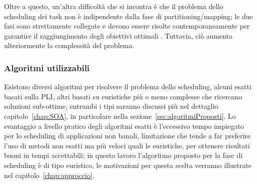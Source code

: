 Oltre a questo, un'altra difficoltà che si incontra è che il problema dello scheduling 
dei task non è indipendente dalla fase di partitioning/mapping; le due fasi sono strettamente 
collegate e devono essere risolte contemporaneamente per garantire il raggiungimento 
degli obiettivi ottimali \cite{AntColonyOptimization}. Tuttavia, ciò aumenta ulteriormente la complessità del 
problema.


\subsubsection{Algoritmi utilizzabili}
Esistono diversi algoritmi per risolvere il problema dello scheduling, alcuni esatti 
basati sulla \ac{PLI}, altri basati su euristiche più o meno complesse che ricercano 
soluzioni sub-ottime, entrambi i tipi saranno discussi più nel dettaglio 
capitolo~\ref{chap:SOA}, in particolare nella sezione~\ref{sec:algoritmiProposti}.
Lo svantaggio a livello pratico degli algoritmi esatti è l'eccessivo tempo 
impiegato per lo scheduling di applicazioni non banali, limitazione che tende a far 
preferire l'uso di metodi non esatti ma più veloci quali le euristiche, per ottenere 
risultati buoni in tempi accettabili; in questo lavoro l'algoritmo proposto per la fase di 
scheduling è di tipo euristico, le motivazioni per questa scelta verranno illustrate nel 
capitolo~\ref{chap:approccio}.

